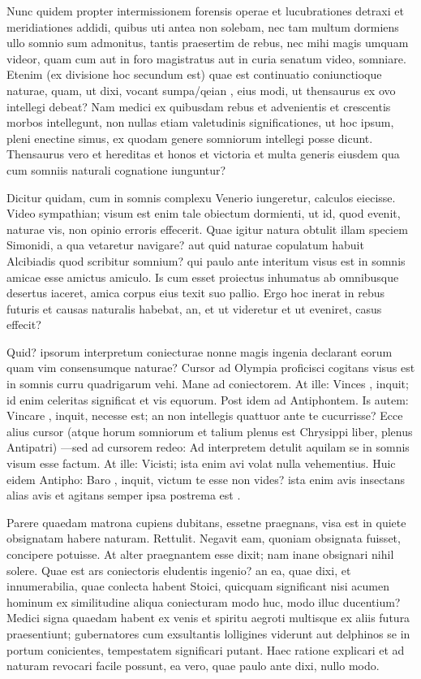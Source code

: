  Nunc quidem propter intermissionem forensis operae et lucubrationes detraxi et meridiationes addidi, quibus uti antea non solebam, nec tam multum dormiens ullo somnio sum admonitus, tantis praesertim de rebus, nec mihi magis umquam videor, quam cum aut in foro magistratus aut in curia senatum video, somniare. Etenim (ex divisione hoc secundum est) quae est continuatio coniunctioque naturae, quam, ut dixi, vocant sumpa/qeian , eius modi, ut thensaurus ex ovo intellegi debeat? Nam medici ex quibusdam rebus et advenientis et crescentis morbos intellegunt, non nullas etiam valetudinis significationes, ut hoc ipsum, pleni enectine simus, ex quodam genere somniorum intellegi posse dicunt. Thensaurus vero et hereditas et honos et victoria et multa generis eiusdem qua cum somniis naturali cognatione iunguntur?

 Dicitur quidam, cum in somnis complexu Venerio iungeretur, calculos eiecisse. Video sympathian; visum est enim tale obiectum dormienti, ut id, quod evenit, naturae vis, non opinio erroris effecerit. Quae igitur natura obtulit illam speciem Simonidi, a qua vetaretur navigare? aut quid naturae copulatum habuit Alcibiadis quod scribitur somnium? qui paulo ante interitum visus est in somnis amicae esse amictus amiculo. Is cum esset proiectus inhumatus ab omnibusque desertus iaceret, amica corpus eius texit suo pallio. Ergo hoc inerat in rebus futuris et causas naturalis habebat, an, et ut videretur et ut eveniret, casus effecit?

 Quid? ipsorum interpretum coniecturae nonne magis ingenia declarant eorum quam vim consensumque naturae? Cursor ad Olympia proficisci cogitans visus est in somnis curru quadrigarum vehi. Mane ad coniectorem. At ille: Vinces , inquit; id enim celeritas significat et vis equorum. Post idem ad Antiphontem. Is autem: Vincare , inquit, necesse est; an non intellegis quattuor ante te cucurrisse? Ecce alius cursor (atque horum somniorum et talium plenus est Chrysippi liber, plenus Antipatri) —sed ad cursorem redeo: Ad interpretem detulit aquilam se in somnis visum esse factum. At ille: Vicisti; ista enim avi volat nulla vehementius. Huic eidem Antipho: Baro , inquit, victum te esse non vides? ista enim avis insectans alias avis et agitans semper ipsa postrema est .

 Parere quaedam matrona cupiens dubitans, essetne praegnans, visa est in quiete obsignatam habere naturam. Rettulit. Negavit eam, quoniam obsignata fuisset, concipere potuisse. At alter praegnantem esse dixit; nam inane obsignari nihil solere. Quae est ars coniectoris eludentis ingenio? an ea, quae dixi, et innumerabilia, quae conlecta habent Stoici, quicquam significant nisi acumen hominum ex similitudine aliqua coniecturam modo huc, modo illuc ducentium? Medici signa quaedam habent ex venis et spiritu aegroti multisque ex aliis futura praesentiunt; gubernatores cum exsultantis lolligines viderunt aut delphinos se in portum conicientes, tempestatem significari putant. Haec ratione explicari et ad naturam revocari facile possunt, ea vero, quae paulo ante dixi, nullo modo.

